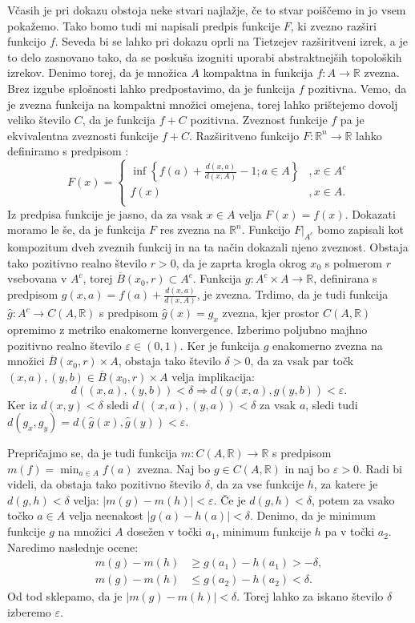 \documentclass[mat1]{fmfdelo}
\newcommand{\R}{\mathbb R}
\newcommand{\0}{0}
\begin{document}
\begin{dokaz}
Včasih je pri dokazu obstoja neke stvari najlažje, če to stvar poiščemo in jo vsem pokažemo. Tako bomo tudi mi napisali predpis funkcije $F$, ki zvezno razširi funkcijo $f$. Seveda bi se lahko pri dokazu oprli na Tietzejev razširitveni izrek, a je to delo zasnovano tako, da se poskuša izogniti uporabi abstraktnejših topoloških izrekov. Denimo torej, da je množica $A$ kompaktna in funkcija \mbox{$f : A \to \R$} zvezna. Brez izgube splošnosti lahko predpostavimo, da je funkcija $f$ pozitivna. Vemo, da je zvezna funkcija na kompaktni množici omejena, torej lahko prištejemo dovolj veliko število $C$, da je funkcija $f + C$ pozitivna. Zveznost funkcije $f$ pa je ekvivalentna zveznosti funkcije $f + C$.
Razširitveno funkcijo \mbox{$F : \R^n \to \R$} lahko definiramo s predpisom :
\[  F(x) = \left \{
\begin{array}{ll}
	\inf \left \{ f(a) + \frac{d(x, a)}{d(x, A)} - 1; a \in A \right \} &, x \in A^c \\
	f(x) &, x \in A. \\
\end{array} 
\right. \]
Iz predpisa funkcije je jasno, da za vsak $x \in A$ velja $F(x) = f(x)$. Dokazati moramo le še, da je funkcija $F$ res zvezna na $\R^n$.
Funkcijo $F|_{A^c}$ bomo zapisali kot kompozitum dveh zveznih funkcij in na ta način dokazali njeno zveznost. Obstaja tako pozitivno realno število $r>0$, da je zaprta krogla okrog $x_0$ s polmerom $r$ vsebovana v $A^c$, torej $\overline{B}(x_0, r) \subset A^c$. Funkcija $g: A^c \times A \to \R$, definirana s predpisom $g(x, a) = f(a) + \frac{d(x, a)}{d(x, A)}$, je zvezna. Trdimo, da je tudi funkcija $\hat{g} : A^c \to C(A, \R)$ s predpisom $\hat{g}(x) = g_x$ zvezna, kjer prostor $C(A, \R)$ opremimo z metriko enakomerne konvergence. Izberimo poljubno majhno pozitivno realno število $\varepsilon \in (0, 1)$. Ker je funkcija $g$ enakomerno zvezna na množici $\overline{B}(x_0, r) \times A$, obstaja tako število $\delta >0$, da za vsak par točk $(x, a), (y, b) \in \overline{B}(x_0, r) \times A$ velja implikacija:
$$d((x, a), (y, b)) < \delta \Rightarrow d(g(x, a), g(y, b))< \varepsilon.$$
Ker iz $d(x, y) < \delta$ sledi $d((x, a), (y, a)) < \delta$ za vsak $a$, sledi tudi $d(g_x, g_y) = d(\hat{g}(x), \hat{g}(y)) < \varepsilon.$ 

Prepričajmo se, da je tudi funkcija $m: C(A, \R) \to \R$ s predpisom $m(f) = \min_{a \in A} f(a)$ zvezna. Naj bo $g \in C(A, \R)$ in naj bo $\varepsilon > 0$. Radi bi videli, da obstaja tako pozitivno število $\delta$, da za vse funkcije $h$, za katere je $d(g, h)<\delta$ velja: $|m(g) - m(h)| < \varepsilon$. Če je $d(g, h)<\delta$, potem za vsako točko $a \in A$ velja neenakost $|g(a) - h(a)| < \delta$. Denimo, da je minimum funkcije $g$ na množici $A$ dosežen v točki $a_1$, minimum funkcije $h$ pa v točki $a_2$. Naredimo naslednje ocene:
\begin{align*}
m(g) - m(h) &\geq g(a_1) - h(a_1) > -\delta,\\
m(g) - m(h) &\leq g(a_2) - h(a_2) < \delta.
\end{align*}
Od tod sklepamo, da je $|m(g) - m(h)| < \delta$. Torej lahko za iskano število $\delta$ izberemo $\varepsilon$.


\end{dokaz}
\end{document}
